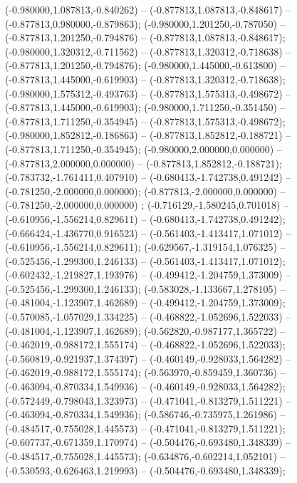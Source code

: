  (-0.980000,1.087813,-0.840262) -- (-0.877813,1.087813,-0.848617) -- (-0.877813,0.980000,-0.879863);
 (-0.980000,1.201250,-0.787050) -- (-0.877813,1.201250,-0.794876) -- (-0.877813,1.087813,-0.848617);
 (-0.980000,1.320312,-0.711562) -- (-0.877813,1.320312,-0.718638) -- (-0.877813,1.201250,-0.794876);
 (-0.980000,1.445000,-0.613800) -- (-0.877813,1.445000,-0.619903) -- (-0.877813,1.320312,-0.718638);
 (-0.980000,1.575312,-0.493763) -- (-0.877813,1.575313,-0.498672) -- (-0.877813,1.445000,-0.619903);
 (-0.980000,1.711250,-0.351450) -- (-0.877813,1.711250,-0.354945) -- (-0.877813,1.575313,-0.498672);
 (-0.980000,1.852812,-0.186863) -- (-0.877813,1.852812,-0.188721) -- (-0.877813,1.711250,-0.354945);
 (-0.980000,2.000000,0.000000) -- (-0.877813,2.000000,0.000000) -- (-0.877813,1.852812,-0.188721);
 (-0.783732,-1.761411,0.407910) -- (-0.680413,-1.742738,0.491242) -- (-0.781250,-2.000000,0.000000);
 (-0.877813,-2.000000,0.000000) -- (-0.781250,-2.000000,0.000000) ;
 (-0.716129,-1.580245,0.701018) -- (-0.610956,-1.556214,0.829611) -- (-0.680413,-1.742738,0.491242);
 (-0.666424,-1.436770,0.916523) -- (-0.561403,-1.413417,1.071012) -- (-0.610956,-1.556214,0.829611);
 (-0.629567,-1.319154,1.076325) -- (-0.525456,-1.299300,1.246133) -- (-0.561403,-1.413417,1.071012);
 (-0.602432,-1.219827,1.193976) -- (-0.499412,-1.204759,1.373009) -- (-0.525456,-1.299300,1.246133);
 (-0.583028,-1.133667,1.278105) -- (-0.481004,-1.123907,1.462689) -- (-0.499412,-1.204759,1.373009);
 (-0.570085,-1.057029,1.334225) -- (-0.468822,-1.052696,1.522033) -- (-0.481004,-1.123907,1.462689);
 (-0.562820,-0.987177,1.365722) -- (-0.462019,-0.988172,1.555174) -- (-0.468822,-1.052696,1.522033);
 (-0.560819,-0.921937,1.374397) -- (-0.460149,-0.928033,1.564282) -- (-0.462019,-0.988172,1.555174);
 (-0.563970,-0.859459,1.360736) -- (-0.463094,-0.870334,1.549936) -- (-0.460149,-0.928033,1.564282);
 (-0.572449,-0.798043,1.323973) -- (-0.471041,-0.813279,1.511221) -- (-0.463094,-0.870334,1.549936);
 (-0.586746,-0.735975,1.261986) -- (-0.484517,-0.755028,1.445573) -- (-0.471041,-0.813279,1.511221);
 (-0.607737,-0.671359,1.170974) -- (-0.504476,-0.693480,1.348339) -- (-0.484517,-0.755028,1.445573);
 (-0.634876,-0.602214,1.052101) -- (-0.530593,-0.626463,1.219993) -- (-0.504476,-0.693480,1.348339);
